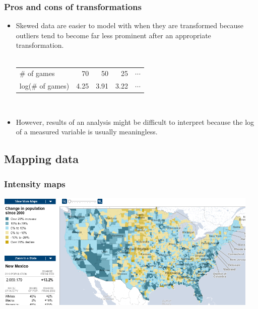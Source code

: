 \begin{frame}
\frametitle{Pros and cons of transformations}

\begin{itemize}

\item Skewed data are easier to model with when they are transformed because outliers tend to become far less prominent after an appropriate transformation. \\
$\:$ \\
\renewcommand{\arraystretch}{1.5}
\begin{tabular}{l r r r r }
\# of games		&  70 	& 50 		& 25 		 		& $\cdots$ \\
log(\# of games)	& 4.25	& 3.91 	& 3.22 	 	& $\cdots$
\end{tabular}

$\:$ \\

\item However, results of an analysis might be difficult to interpret because the log of a measured variable is usually meaningless.

\end{itemize}

\pause



\end{frame}


\subsection{Mapping data}


\begin{frame}
\frametitle{Intensity maps}


\begin{center}
\includegraphics[width=0.95\textwidth]{2-1_numerical_data/figures/change_in_pop_intensity}
\end{center}


\end{frame}



